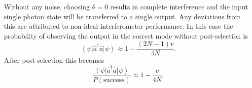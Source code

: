 \documentclass[aps,pra,twocolumn,superscriptaddress,numerical,floatfix]{revtex4-1}
\begin{document}
Without any noise, choosing $\theta=0$ results in complete interference and the input single photon state will be transferred to a single output.  Any deviations from this are attributed to non-ideal interferometer performance. 
In this case the probability of observing the output in the correct mode without post-selection is
\begin{equation}
	\left\langle \psi\right|\hat{a}^{\dagger}\hat{a}\left|\psi\right\rangle \approx 1 - \frac{(2N-1)v}{4N}. \label{eq:1pNoPost}
\end{equation}
After post-selection this becomes
\begin{equation}
	\frac{\left\langle \psi\right|\hat{a}^{\dagger}\hat{a}\left|\psi\right\rangle}{P(\textrm{success})} \approx 1 - \frac{v}{4N}. \label{eq:1pWithPost}
\end{equation}
		
\end{document}
